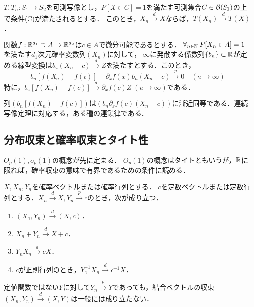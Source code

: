 \documentclass[uplatex,dvipdfmx]{jsreport}
\begin{document}
\begin{theorem}[連続写像定理]
    $T,T_n:S_1\to S_2$を可測写像とし，$P[X\in C]=1$を満たす可測集合$C\in\mathcal{B}(S_1)$の上で条件(C)が満たされるとする．
    このとき，$X_n\xrightarrow{d}X$ならば，$T(X_n)\xrightarrow{d}T(X)$．
\end{theorem}

\begin{theorem}[デルタ法]\label{thm-delta-method}
    関数$f:\mathbb{R}^{d_1}\supset A\to\mathbb{R}^{d_2}$は$c\in A$で微分可能であるとする．
    $\forall_{n\in\mathbb{N}}\;P[X_n\in A]=1$を満たす$d_1$次元確率変数列$(X_n)$に対して，
    $\infty$に発散する係数列$\{b_n\}\subset\mathbb{R}$が定める線型変換は$b_n(X_n-c)\xrightarrow{d}Z$を満たすとする．このとき，
    \[b_n[f(X_n)-f(c)]-\partial_xf(x)b_n(X_n-c)\xrightarrow{p}0\quad(n\to\infty)\]
    特に，$b_n[f(X_n)-f(c)]\xrightarrow{d}\partial_xf(c)Z\;(n\to\infty)$である．
\end{theorem}
\begin{remarks}
    列$(b_n[f(X_n)-f(c)])$は$(b_n\partial_xf(c)(X_n-c))$に漸近同等である．連続写像定理に対応する，ある種の連鎖律である．
\end{remarks}

\subsection{分布収束と確率収束とタイト性}

\begin{tcolorbox}[colframe=ForestGreen, colback=ForestGreen!10!white,breakable,colbacktitle=ForestGreen!40!white,coltitle=black,fonttitle=\bfseries\sffamily,
title=]
    $O_p(1),o_p(1)$の概念が先に定まる．
    $O_p(1)$の概念はタイトともいうが，$\mathbb{R}$に限れば，確率収束の意味で有界であるための条件に読める．
\end{tcolorbox}

\begin{theorem}
    $X,X_n,Y_n$を確率ベクトルまたは確率行列とする．
    $c$を定数ベクトルまたは定数行列とする．$X_n\xrightarrow{d}X,Y_n\xrightarrow{p}c$のとき，次が成り立つ．
    \begin{enumerate}
        \item $(X_n,Y_n)\xrightarrow{d}(X,c)$．
        \item $X_n+Y_n\xrightarrow{d}X+c$．
        \item $Y_nX_n\xrightarrow{d}cX$．
        \item $c$が正則行列のとき，$Y_n^{-1}X_n\xrightarrow{d}c^{-1}X$．
    \end{enumerate}
\end{theorem}
\begin{remark}
    定値関数ではない$Y$に対して$Y_n\xrightarrow{p}Y$であっても，結合ベクトルの収束$(X_n,Y_n)\xrightarrow{d}(X,Y)$は一般には成り立たない．
\end{remark}
\end{document}
